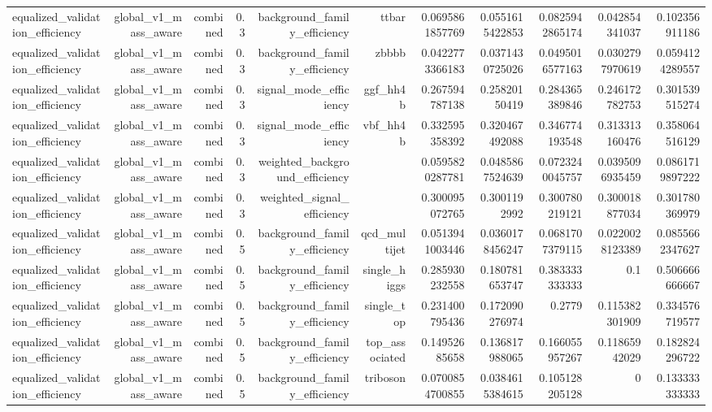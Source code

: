 \begin{table}[htbp]
{\begin{tabular}{lrrrrrrrrrr}
equalized\_validation\_efficiency & global\_v1\_mass\_aware & combined & 0.3 & background\_family\_efficiency & ttbar & 0.0695861857769 & 0.0551615422853 & 0.0825942865174 & 0.042854341037 & 0.102356911186 \\
equalized\_validation\_efficiency & global\_v1\_mass\_aware & combined & 0.3 & background\_family\_efficiency & zbbbb & 0.0422773366183 & 0.0371430725026 & 0.0495016577163 & 0.0302797970619 & 0.0594124289557 \\
equalized\_validation\_efficiency & global\_v1\_mass\_aware & combined & 0.3 & signal\_mode\_efficiency & ggf\_hh4b & 0.267594787138 & 0.25820150419 & 0.284365389846 & 0.246172782753 & 0.301539515274 \\
equalized\_validation\_efficiency & global\_v1\_mass\_aware & combined & 0.3 & signal\_mode\_efficiency & vbf\_hh4b & 0.332595358392 & 0.320467492088 & 0.346774193548 & 0.313313160476 & 0.358064516129 \\
equalized\_validation\_efficiency & global\_v1\_mass\_aware & combined & 0.3 & weighted\_background\_efficiency &  & 0.0595820287781 & 0.0485867524639 & 0.0723240045757 & 0.0395096935459 & 0.0861719897222 \\
equalized\_validation\_efficiency & global\_v1\_mass\_aware & combined & 0.3 & weighted\_signal\_efficiency &  & 0.300095072765 & 0.3001192992 & 0.300780219121 & 0.300018877034 & 0.301780369979 \\
equalized\_validation\_efficiency & global\_v1\_mass\_aware & combined & 0.5 & background\_family\_efficiency & qcd\_multijet & 0.0513941003446 & 0.0360178456247 & 0.0681707379115 & 0.0220028123389 & 0.0855662347627 \\
equalized\_validation\_efficiency & global\_v1\_mass\_aware & combined & 0.5 & background\_family\_efficiency & single\_higgs & 0.285930232558 & 0.180781653747 & 0.383333333333 & 0.1 & 0.506666666667 \\
equalized\_validation\_efficiency & global\_v1\_mass\_aware & combined & 0.5 & background\_family\_efficiency & single\_top & 0.231400795436 & 0.172090276974 & 0.2779 & 0.115382301909 & 0.334576719577 \\
equalized\_validation\_efficiency & global\_v1\_mass\_aware & combined & 0.5 & background\_family\_efficiency & top\_associated & 0.14952685658 & 0.136817988065 & 0.166055957267 & 0.11865942029 & 0.182824296722 \\
equalized\_validation\_efficiency & global\_v1\_mass\_aware & combined & 0.5 & background\_family\_efficiency & triboson & 0.0700854700855 & 0.0384615384615 & 0.105128205128 & 0 & 0.133333333333 \\

\end{tabular}}
\end{table}

